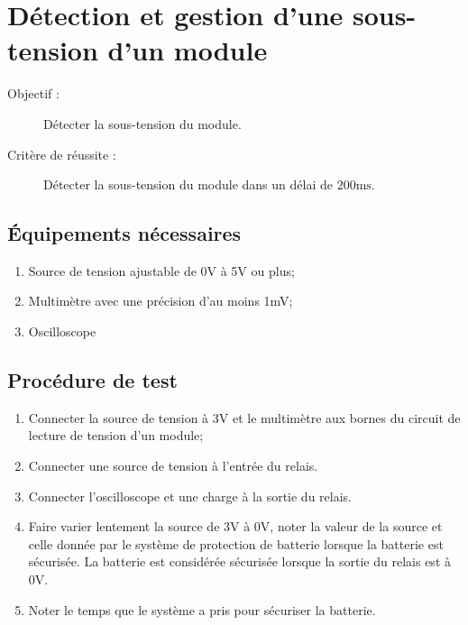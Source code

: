 
\section{Détection et gestion d'une sous-tension d'un module}

\begin{description}
	\item[Objectif :] Détecter la sous-tension du module.
	\item[Critère de réussite :] Détecter la sous-tension du module dans un délai de $200\text{ms}$.
\end{description}

\subsection*{Équipements nécessaires}
\begin{enumerate}
	\item Source de tension ajustable de 0V à 5V ou plus;
	\item Multimètre avec une précision d'au moins 1mV;
	\item Oscilloscope
\end{enumerate}	

\subsection*{Procédure de test}
\begin{enumerate}
	\item Connecter la source de tension à 3V et le multimètre aux bornes du circuit de lecture de tension d'un module;
	\item Connecter une source de tension à l'entrée du relais.
	\item Connecter l'oscilloscope et une charge à la sortie du relais.
	\item Faire varier lentement la source de 3V à 0V, noter la valeur de la source et celle donnée par le système de protection de batterie lorsque la batterie est sécurisée. La batterie est considérée sécurisée lorsque la sortie du relais est à 0V. 
	\item Noter le temps que le système a pris pour sécuriser la batterie.
\end{enumerate}